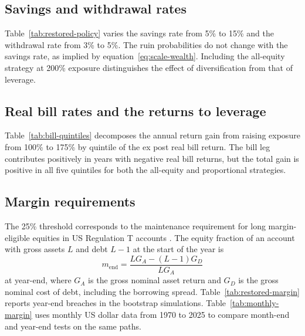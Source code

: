 

\subsection{Savings and withdrawal rates}
\label{app:policy-sensitivity}

Table~\ref{tab:restored-policy} varies the savings rate from 5\% to 15\% and the withdrawal rate from 3\% to
5\%. The ruin probabilities do not change with the savings rate, as implied by
equation~\eqref{eq:scale-wealth}. Including the all-equity strategy at 200\% exposure distinguishes the
effect of diversification from that of leverage.



\subsection{Real bill rates and the returns to leverage}
\label{app:bill-attribution}

Table~\ref{tab:bill-quintiles} decomposes the annual return gain from raising exposure from 100\% to 175\%
by quintile of the ex post real bill return. The bill leg contributes positively in years with negative
real bill returns, but the total gain is positive in all five quintiles for both the all-equity and
proportional strategies.



\subsection{Margin requirements}
\label{app:margin-call}

The 25\% threshold corresponds to the maintenance requirement for long margin-eligible equities in US
Regulation T accounts \citep{FINRAMargin2021}. The equity fraction of an account with gross assets $L$ and
debt $L-1$ at the start of the year is
\begin{equation}
 m_{\text{end}}=\frac{LG_A-(L-1)G_D}{LG_A}
\end{equation}
at year-end, where $G_A$ is the gross nominal asset return and $G_D$ is the gross nominal cost of debt,
including the borrowing spread. Table~\ref{tab:restored-margin} reports year-end breaches in the
bootstrap simulations. Table~\ref{tab:monthly-margin} uses monthly US dollar data from 1970 to 2025 to
compare month-end and year-end tests on the same paths.

